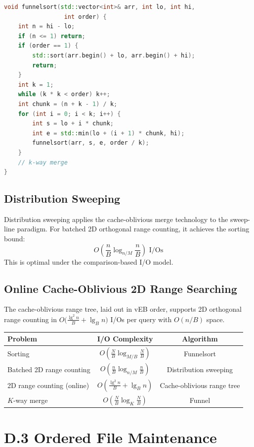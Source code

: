 \begin{lstlisting}[language=C++]
void funnelsort(std::vector<int>& arr, int lo, int hi,
                 int order) {
    int n = hi - lo;
    if (n <= 1) return;
    if (order == 1) {
        std::sort(arr.begin() + lo, arr.begin() + hi);
        return;
    }
    int k = 1;
    while (k * k < order) k++;
    int chunk = (n + k - 1) / k;
    for (int i = 0; i < k; i++) {
        int s = lo + i * chunk;
        int e = std::min(lo + (i + 1) * chunk, hi);
        funnelsort(arr, s, e, order / k);
    }
    // k-way merge
}
\end{lstlisting}

\subsection{Distribution Sweeping}

Distribution sweeping applies the cache-oblivious merge technology to the sweep-line paradigm. For batched 2D orthogonal range counting, it achieves the sorting bound:
\[
  O\!\left(\frac{n}{B} \log_{n/M} \frac{n}{B}\right) \text{ I/Os}
\]
This is optimal under the comparison-based I/O model.

\subsection{Online Cache-Oblivious 2D Range Searching}

The cache-oblivious range tree, laid out in vEB order, supports 2D orthogonal range counting in $O\bigl(\frac{\lg^2 n}{B} + \lg_B n\bigr)$ I/Os per query with $O(n/B)$ space.

\begin{center}
\begin{tabular}{lcc}
\toprule
Problem & I/O Complexity & Algorithm \\
\midrule
Sorting & $O(\frac{N}{B} \log_{M/B} \frac{N}{B})$ & Funnelsort \\
Batched 2D range counting & $O(\frac{n}{B} \log_{n/M} \frac{n}{B})$ & Distribution sweeping \\
2D range counting (online) & $O(\frac{\lg^2 n}{B} + \lg_B n)$ & Cache-oblivious range tree \\
$K$-way merge & $O(\frac{N}{B} \log_{K} \frac{N}{B})$ & Funnel \\
\bottomrule
\end{tabular}
\end{center}

\section{D.3 Ordered File Maintenance}
\label{sec:ordered-file}

